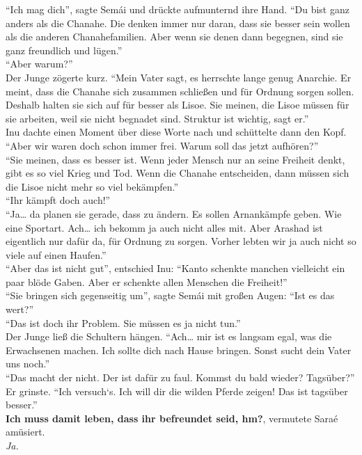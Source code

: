 \documentclass[a4paper,12pt]{book}
\begin{document}
``Ich mag dich'', sagte Semái und drückte aufmunternd ihre Hand. ``Du bist ganz anders als die 
Chanahe. Die denken immer nur daran, dass sie besser sein wollen als die anderen Chanahefamilien. 
Aber wenn sie denen dann begegnen, sind sie ganz freundlich und lügen.''\\
``Aber warum?''\\
Der Junge zögerte kurz. ``Mein Vater sagt, es herrschte lange genug Anarchie. Er meint, dass die 
Chanahe sich zusammen schließen und für Ordnung sorgen sollen. Deshalb halten sie sich auf für 
besser als Lisoe. Sie meinen, die Lisoe müssen für sie arbeiten, weil sie nicht begnadet sind. 
Struktur ist wichtig, sagt er.''\\
Inu dachte einen Moment über diese Worte nach und schüttelte dann den Kopf. ``Aber wir waren doch 
schon immer frei. Warum soll das jetzt aufhören?''\\
``Sie meinen, dass es besser ist. Wenn jeder Mensch nur an seine Freiheit denkt, gibt es so viel 
Krieg und Tod. Wenn die Chanahe entscheiden, dann müssen sich die Lisoe nicht mehr so viel 
bekämpfen.''\\
``Ihr kämpft doch auch!''\\
``Ja… da planen sie gerade, dass zu ändern. Es sollen Arnankämpfe geben. Wie eine Sportart. Ach… 
ich  bekomm ja auch nicht alles mit. Aber Arashad ist eigentlich nur dafür da, für Ordnung zu 
sorgen. Vorher lebten wir ja auch nicht so viele auf einen Haufen.''\\
``Aber das ist nicht gut'', entschied Inu: ``Kanto schenkte manchen vielleicht ein paar blöde 
Gaben. Aber er schenkte allen Menschen die Freiheit!''\\
``Sie bringen sich gegenseitig um'', sagte Semái mit großen Augen: ``Ist es das wert?''\\
``Das ist doch ihr Problem. Sie müssen es ja nicht tun.''\\
Der Junge ließ die Schultern hängen. ``Ach… mir ist es langsam egal, was die Erwachsenen machen. 
Ich sollte dich nach Hause bringen. Sonst sucht dein Vater uns noch.''\\
``Das macht der nicht. Der ist dafür zu faul. Kommst du bald wieder? Tagsüber?''\\
Er grinste. ``Ich versuch‘s. Ich will dir die wilden Pferde zeigen! Das ist tagsüber besser.''\\
\textbf{Ich muss damit leben, dass ihr befreundet seid, hm?}, vermutete Saraé amüsiert.\\
\textit{Ja.}\\
\end{document}

